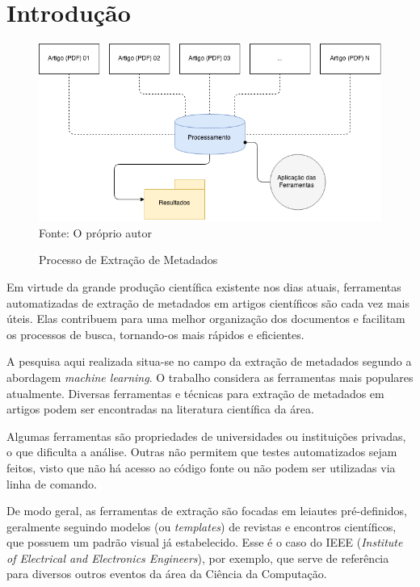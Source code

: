 
\chapter{Introdução}
\label{cha:introduction}


\begin{figure}
    \centering
    \caption{Processo de Extração de Metadados}
    \label{fig:introduction}
    \includegraphics[width=0.9\linewidth]{./assets/images/introduction}
    \center\footnotesize{Fonte: O próprio autor}
\end{figure}


Em virtude da grande produção científica existente nos dias atuais, ferramentas automatizadas de extração de metadados em artigos científicos são cada vez mais úteis. Elas contribuem para uma melhor organização dos documentos e facilitam os processos de busca, tornando-os mais rápidos e eficientes.

A pesquisa aqui realizada situa-se no campo da extração de metadados segundo a abordagem \textit{machine learning}. O trabalho considera as ferramentas mais populares atualmente. Diversas ferramentas e técnicas para extração de metadados em artigos podem ser encontradas na literatura científica da área. 

Algumas ferramentas são propriedades de universidades ou instituições privadas, o que dificulta a análise. Outras não permitem que testes automatizados sejam feitos, visto que não há acesso ao código fonte ou não podem ser utilizadas via linha de comando.

De modo geral, as ferramentas de extração são focadas em leiautes pré-definidos, geralmente seguindo modelos (ou \textit{templates}) de revistas e encontros científicos, que possuem um padrão visual já estabelecido. Esse é o caso do IEEE (\textit{Institute of Electrical and Electronics Engineers}), por exemplo, que serve de referência para diversos outros eventos da área da Ciência da Computação. 

